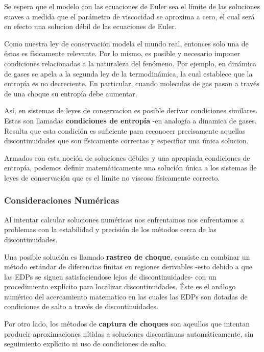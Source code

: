 Se espera que el modelo con las ecuaciones de Euler sea el límite de las soluciones suaves a medida que el parámetro de viscocidad se aproxima a cero, el cual será en efecto una solucion débil de las ecuaciones de Euler.

Como nuestra ley de conservación modela el mundo real, entonces solo una de éstas es físicamente relevante. Por lo mismo, es posible y necesario imponer condiciones relacionadas a la naturaleza del fenómeno. Por ejemplo, en dinámica de gases se apela a la segunda ley de la termodinámica, la cual establece que la entropía es no decreciente. En particular, cuando moleculas de gas pasan a través de una choque su entropía debe aumentar. 

Así, en sistemas de leyes de conservacion es posible derivar condiciones similares. Estas son llamadas \textbf{condiciones de entropía} -en analogía a dinamica de gases. Resulta que esta condición es suficiente para reconocer precisamente aquellas discontinuidades que son físicamente correctas y especifiar una única solucion.

Armados con esta noción de soluciones débiles y una apropiada condiciones de entropía, podemos definir matemáticamente una solución única a los sistemas de leyes de conservación  que es el límite no viscoso físicamente correcto.

\subsubsection*{Consideraciones Numéricas}
Al intentar calcular soluciones numéricas nos enfrentamos nos enfrentamos a problemas con la estabilidad y precisión de los métodos cerca de las discontinuidades.

Una posible solución es llamado \textbf{rastreo de choque}, consiste en combinar un método estándar de diferencias finitas en regiones derivables -esto debido a que las EDPs se siguen satisfaciendose lejos de discontinuidades- con un procedimiento explícito para localizar discontinuidades. Éste es el análogo numérico del acercamiento matematico en las cuales las EDPs son dotadas de condiciones de salto a través de discontinuidades.

Por otro lado, los métodos de \textbf{captura de choques} son aqeullos que intentan producir aproximaciones nítidas a soluciones discontinuas automáticamente, sin seguimiento explícito ni uso de condiciones de salto. 

